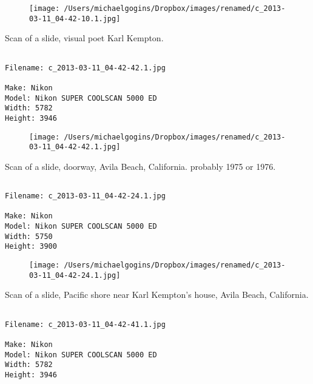 \documentclass[11pt,letter,DIV=14,paper=landscape]{scrbook}
\begin{document}
\begin{figure}
\texttt{[image: /Users/michaelgogins/Dropbox/images/renamed/c\_2013-03-11\_04-42-10.1.jpg]}
\end{figure}
    
\clearpage
\noindent Scan of a slide, visual poet Karl Kempton.
\noindent
\begin{lstlisting}

Filename: c_2013-03-11_04-42-42.1.jpg

Make: Nikon
Model: Nikon SUPER COOLSCAN 5000 ED
Width: 5782
Height: 3946
\end{lstlisting}
\clearpage

\begin{figure}
\texttt{[image: /Users/michaelgogins/Dropbox/images/renamed/c\_2013-03-11\_04-42-42.1.jpg]}
\end{figure}
    
\clearpage
\noindent Scan of a slide, doorway, Avila Beach, California. probably 1975 or 1976.
\noindent
\begin{lstlisting}

Filename: c_2013-03-11_04-42-24.1.jpg

Make: Nikon
Model: Nikon SUPER COOLSCAN 5000 ED
Width: 5750
Height: 3900
\end{lstlisting}
\clearpage

\begin{figure}
\texttt{[image: /Users/michaelgogins/Dropbox/images/renamed/c\_2013-03-11\_04-42-24.1.jpg]}
\end{figure}
    
\clearpage
\noindent Scan of a slide, Pacific shore near Karl Kempton's house, Avila Beach, California.
\noindent
\begin{lstlisting}

Filename: c_2013-03-11_04-42-41.1.jpg

Make: Nikon
Model: Nikon SUPER COOLSCAN 5000 ED
Width: 5782
Height: 3946
\end{lstlisting}
\clearpage
\end{document}
